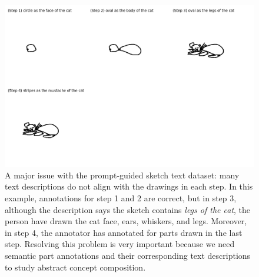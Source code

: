 \begin{figure}[!h]
  
\centering
\includegraphics[width=\linewidth]{data_collection/v1_misalign_text_drawing.png}
\caption{A major issue with the prompt-guided sketch text dataset: many text descriptions do not align with the drawings in each step. In this example, annotations for step 1 and 2 are correct, but in step 3, although the description says the sketch contains \textit{legs of the cat}, the person have drawn the cat face, ears, whiskers, and legs. Moreover, in step 4, the annotator has annotated for parts drawn in the last step. Resolving this problem is very important because we need semantic part annotations and their corresponding text descriptions to study abstract concept composition.}
\label{v1.misalign}
\end{figure}



